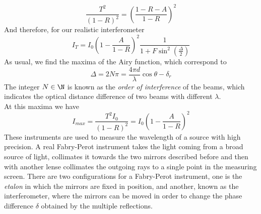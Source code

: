 \documentclass[../electromagnetism.tex]{subfiles}
\begin{document}
\begin{equation*}
	\frac{T^2}{(1-R)^2}=\left( \frac{1-R-A}{1-R} \right)^2
\end{equation*}
And therefore, for our realistic interferometer
\begin{equation}
	I_T=I_0\left( 1-\frac{A}{1-R} \right)^2\frac{1}{1+F\sin^2\left( \frac{\Delta}{2} \right)}
	\label{eq:realfinesse.fpi}
\end{equation}
As usual, we find the maxima of the Airy function, which correspond to
\begin{equation}
	\Delta=2N\pi=\frac{4\pi d}{\lambda}\cos\theta-\delta_r
	\label{eq:maxima.fpi}
\end{equation}
The integer $N\in\N$ is known as the \textit{order of interference} of the beams, which indicates the optical distance difference of two beams with different $\lambda$.\\
At this maxima we have
\begin{equation}
	I_{max}=\frac{T^2I_0}{(1-R)^2}=I_0\left( 1-\frac{A}{1-R} \right)^2
	\label{eq:peakint.fpi}
\end{equation}
These instruments are used to measure the wavelength of a source with high precision. A real Fabry-Perot instrument takes the light coming from a broad source of light, collimates it towards the two mirrors described before and then with another lense collimates the outgoing rays to a single point in the measuring screen. There are two configurations for a Fabry-Perot instrument, one is the \textit{etalon} in which the mirrors are fixed in position, and another, known as the interferometer, where the mirrors can be moved in order to change the phase difference $\delta$ obtained by the multiple reflections.
\end{document}
